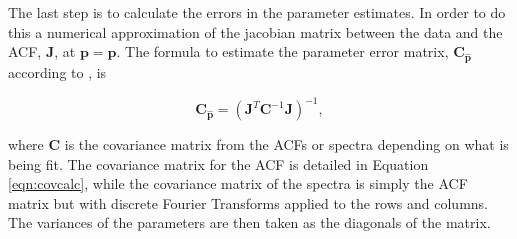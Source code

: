 
The last step is to calculate the errors in the parameter estimates. In order to do this a numerical approximation of the jacobian matrix between the data and the ACF, $\mathbf{J}$, at $\mathbf{p}=\mathbf{\hat{p}}$. The formula to estimate the parameter error matrix, $\mathbf{C}_{\mathbf{\hat{p}}}$ according to \cite{Hysell:2000cq}, is


\begin{equation}
\label{eqn:jacinv}
\mathbf{C}_{\mathbf{\hat{p}}}=(\mathbf{J}^T \mathbf{C}^{-1}\mathbf{J})^{-1},
\end{equation}

\noindent where $ \mathbf{C}$ is the covariance matrix from the ACFs or spectra depending on what is being fit. The covariance matrix for the ACF is detailed in Equation \ref{eqn:covcalc}, while the covariance matrix of the spectra is simply the ACF matrix but with discrete Fourier Transforms applied to the rows and columns. The variances of the parameters are then taken as the diagonals of the matrix.


%
%



